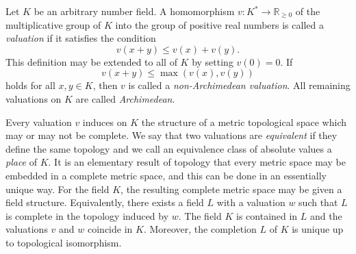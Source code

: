 
Let $K$ be an arbitrary number field. A homomorphism $v: K^* \to \mathbb{R}_{\geq 0}$ of the multiplicative group of $K$ into the group of positive real numbers is called a \textit{valuation} if it satisfies the condition
\[v(x+y) \leq v(x) + v(y).\]
This definition may be extended to all of $K$ by setting $v(0) = 0$. If
\[v(x+y) \leq \max(v(x),v(y))\]
holds for all $x,y \in K$, then $v$ is called a \textit{non-Archimedean valuation}. All remaining valuations on $K$ are called \textit{Archimedean}. 

Every valuation $v$ induces on $K$ the structure of a metric topological space which may or may not be complete. We say that two valuations are \textit{equivalent} if they define the same topology and we call an equivalence class of absolute values a \textit{place} of $K$. It is an elementary result of topology that every metric space may be embedded in a complete metric space, and this can be done in an essentially unique way. For the field $K$, the resulting complete metric space may be given a field structure. Equivalently, there exists a field $L$ with a valuation $w$ such that $L$ is complete in the topology induced by $w$. The field $K$ is contained in $L$ and the valuations $v$ and $w$ coincide in $K$. Moreover, the completion $L$ of $K$ is unique up to topological isomorphism.

